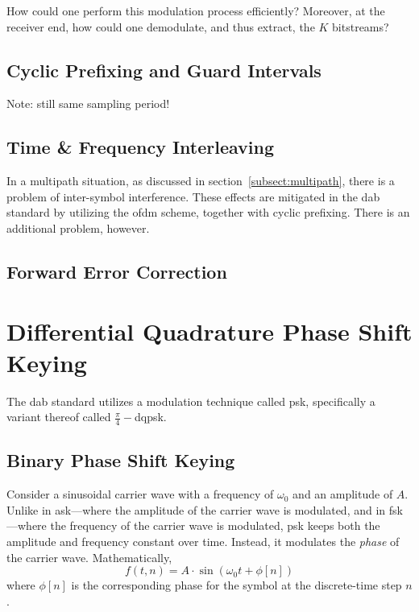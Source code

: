 \documentclass[class=report,11pt,crop=false]{standalone}
\begin{document}
How could one perform this modulation process efficiently? Moreover, at the receiver end, how could one demodulate, and thus extract, the \(K\) bitstreams?

\subsection{Cyclic Prefixing and Guard Intervals}

\begin{figure}[htbp]
    \centering
    \captionsetup{type=figure}
    \def\svgwidth{1\linewidth}
    { %
        }
    \caption{}
    \label{fig:cyclic-prefix}
\end{figure}

Note: still same sampling period!


\subsection{Time \& Frequency Interleaving}
In a multipath situation, as discussed in section~\ref{subsect:multipath}, there is a problem of inter-symbol interference. These effects are mitigated in the \gls{dab} standard by utilizing the \gls{ofdm} scheme, together with cyclic prefixing. There is an additional problem, however. 

\begin{figure}[htbp]
    \centering
    \captionsetup{type=figure}
    \def\svgwidth{1\linewidth}
    { %
        }
    \caption{}
    \label{fig:ofdm-selective-fading}
\end{figure}


\subsection{Forward Error Correction}

\section{Differential Quadrature Phase Shift Keying \label{sect:dab-std_psk}}

The \gls{dab} standard utilizes a modulation technique called \acrlong{psk}, specifically a variant thereof called \(\frac{\pi}{4}-\)\gls{dqpsk}.

\subsection{Binary Phase Shift Keying}
Consider a sinusoidal carrier wave with a frequency of \(\omega_0\) and an amplitude of \(A\). Unlike in \gls{ask}---where the amplitude of the carrier wave is modulated, and in \gls{fsk}---where the frequency of the carrier wave is modulated, \gls{psk} keeps both the amplitude and frequency constant over time. Instead, it modulates the \emph{phase} of the carrier wave. Mathematically,
\begin{equation}
    f(t, n) = A \cdot \sin(\omega_0t + \phi[n])
\end{equation}
where \(\phi[n]\) is the corresponding phase for the symbol at the discrete-time step \(n\).
\end{document}
